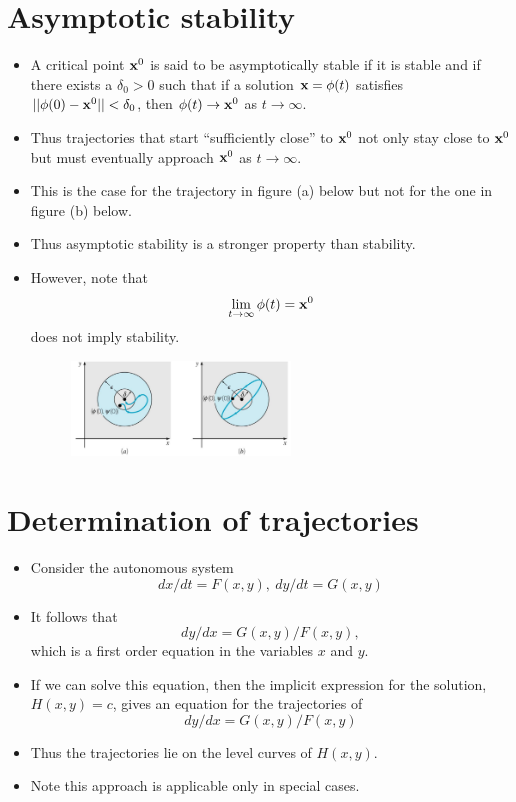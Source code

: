 \documentclass[11pt,a4paper]{article}
\begin{document}
	\section*{Asymptotic stability}
	\begin{itemize}
		\item A critical point $\vb{x}^0$ is said to be asymptotically stable if it is stable and if there exists a $\delta_0 > 0$ such that if a solution $\vb{x} = \phi(t)$ satisfies $||\phi(0) - \vb{x}^0|| < \delta_0$, then $\phi(t) \to \vb{x}^0$ as $t \to \infty$.
		\item Thus trajectories that start “sufficiently close” to $\vb{x}^0$ not only stay close to $\vb{x}^0$ but must eventually approach $\vb{x}^0$ as $t \to \infty$.
		\item This is the case for the trajectory in figure (a) below but not for the one in figure (b) below.
		\item Thus asymptotic stability is a stronger property than stability.
		\item However, note that
		$$
		\lim_{t\to \infty} \phi(t) = \vb{x}^0
		$$
		does not imply stability.
		\begin{figure}[H]
			\centering
				\includegraphics[width=0.55\textwidth]{figure/Lec16f1.PNG}
		\end{figure}
	\end{itemize}
	\section*{Determination of trajectories}
	\begin{itemize}
		\item Consider the autonomous system
		$$
		dx/dt = F(x,y),\ dy/dt = G(x,y)
		$$
		\item It follows that
		$$
		dy/dx = G(x,y)/F(x,y),
		$$
		which is a first order equation in the variables $x$ and $y$.
		\item If we can solve this equation, then the implicit expression for the solution, $H(x,y) = c$, gives an equation for the trajectories of
		$$
		dy/dx = G(x,y)/F(x,y)
		$$
		\item Thus the trajectories lie on the level curves of $H(x,y)$.
		\item Note this approach is applicable only in special cases. 
	\end{itemize}
\end{document}

